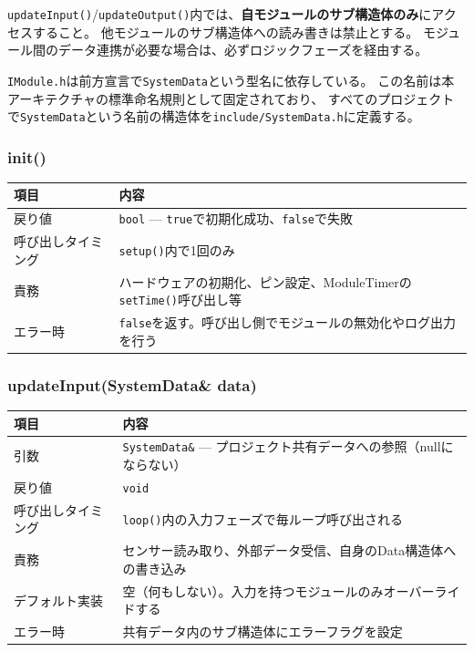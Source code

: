 \begin{cautionbox}[データアクセスルール]
\texttt{updateInput()}/\texttt{updateOutput()}内では、\textbf{自モジュールのサブ構造体のみ}にアクセスすること。
他モジュールのサブ構造体への読み書きは禁止とする。
モジュール間のデータ連携が必要な場合は、必ずロジックフェーズを経由する。
\end{cautionbox}

\begin{notebox}
\texttt{IModule.h}は前方宣言で\texttt{SystemData}という型名に依存している。
この名前は本アーキテクチャの標準命名規則として固定されており、
すべてのプロジェクトで\texttt{SystemData}という名前の構造体を\texttt{include/SystemData.h}に定義する。
\end{notebox}

\subsubsection{init()}

\begin{tabularx}{\textwidth}{l X}
\toprule
\textbf{項目} & \textbf{内容} \\
\midrule
戻り値 & \texttt{bool} — \texttt{true}で初期化成功、\texttt{false}で失敗 \\
呼び出しタイミング & \texttt{setup()}内で1回のみ \\
責務 & ハードウェアの初期化、ピン設定、ModuleTimerの\texttt{setTime()}呼び出し等 \\
エラー時 & \texttt{false}を返す。呼び出し側でモジュールの無効化やログ出力を行う \\
\bottomrule
\end{tabularx}

\subsubsection{updateInput(SystemData\& data)}

\begin{tabularx}{\textwidth}{l X}
\toprule
\textbf{項目} & \textbf{内容} \\
\midrule
引数 & \texttt{SystemData\&} — プロジェクト共有データへの参照（nullにならない） \\
戻り値 & \texttt{void} \\
呼び出しタイミング & \texttt{loop()}内の入力フェーズで毎ループ呼び出される \\
責務 & センサー読み取り、外部データ受信、自身のData構造体への書き込み \\
デフォルト実装 & 空（何もしない）。入力を持つモジュールのみオーバーライドする \\
エラー時 & 共有データ内のサブ構造体にエラーフラグを設定 \\
\bottomrule
\end{tabularx}

